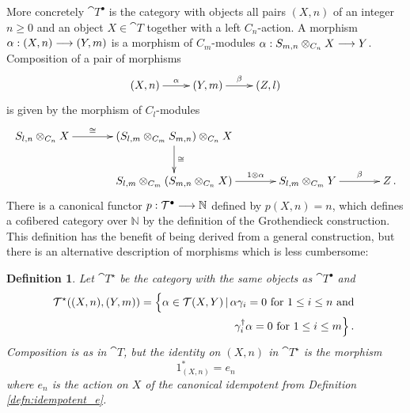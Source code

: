 \documentclass[english,letter paper,12pt,leqno]{article}
\theoremstyle{example}
\newtheorem{definition}[theorem]{Definition}
\numberwithin{equation}{section}
\begin{document}
More concretely $\cat{T}^\bullet$ is the category with objects all pairs $(X,n)$ of an integer $n \ge 0$ and an object $X \in \cat{T}$ together with a left $C_n$-action. A morphism $\alpha: (X,n) \longrightarrow (Y,m)$ is a morphism of $C_m$-modules $\alpha: S_{m,n} \otimes_{C_n} X \longrightarrow Y$. Composition of a pair of morphisms
\begin{equation}\label{eq:comp_chain0}
\xymatrix{
(X,n) \ar[r]^-{\alpha} & (Y,m) \ar[r]^-{\beta} & (Z,l)
}
\end{equation}
is given by the morphism of $C_l$-modules
\begin{equation}\label{eq:comp_chain1}
\xymatrix@C+1pc{
S_{l, n} \otimes_{C_n} X \ar[r]^-{\cong} & (S_{l,m} \otimes_{C_m} S_{m,n}) \otimes_{C_n} X \ar[d]^-{\cong}\\
& S_{l,m} \otimes_{C_m} ( S_{m,n} \otimes_{C_n} X ) \ar[r]^-{ 1 \otimes \alpha } & S_{l,m} \otimes_{C_m} Y \ar[r]^-{\beta} & Z\,.
}
\end{equation}
There is a canonical functor $p: \mathcal{T}^\bullet \longrightarrow \mathbb{N}$ defined by $p(X,n) = n$, which defines a cofibered category over $\mathbb{N}$ by the definition of the Grothendieck construction. This definition has the benefit of being derived from a general construction, but there is an alternative description of morphisms which is less cumbersome:

\begin{definition} Let $\cat{T}^{\star}$ be the category with the same objects as $\cat{T}^\bullet$ and
\begin{align*}
\mathcal{T}^{\star}( (X,n), (Y,m) ) &= \Big\{ \alpha \in \mathcal{T}(X,Y) \,|\, \alpha \gamma_i = 0 \text{ for } 1 \le i \le n \text{ and }\\
&\qquad \qquad\qquad \qquad \;\; \gamma_i^\dagger \alpha = 0 \text{ for } 1 \le i \le m \Big\}\,.
\end{align*}
Composition is as in $\cat{T}$, but the identity on $(X,n)$ in $\cat{T}^\star$ is the morphism
\[
1^*_{(X,n)} = e_n
\]
where $e_n$ is the action on $X$ of the canonical idempotent from Definition \ref{defn:idempotent_e}.
\end{definition}
\end{document}
